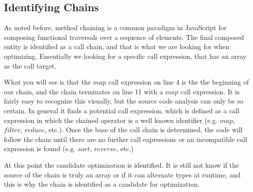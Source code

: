 \subsection{Identifying Chains}

As noted before, method chaining is a common paradigm in JavaScript for composing functional traversals over a sequence of elements.  The final composed entity is identified as a call chain, and that is what we are looking for when optimizing.  Essentially we looking for a specific call expression, that has an array as the call target. 

\begin{minipage}{\linewidth}

\end{minipage}

What you will see is that the $map$ call expression on line 4 is the the beginning of our chain, and the chain terminates on line 11 with a $map$ call expression.  It is fairly easy to recognize this visually, but the source code analysis can only be so certain.  In general it finds a potential call expression, which is defined as a call expression in which the chained operator is a well known identifier (e.g. $map$, $filter$, $reduce$, etc.). Once the base of the call chain is determined, the code will follow the chain until there are no further call expressions or an incompatible call expression is found (e.g. $sort$, $reverse$, etc.)

At this point the candidate optimization is identified.  It is still not know if the source of the chain is truly an array or if it can alternate types at runtime, and this is why the chain is identified as a candidate for optimization. 